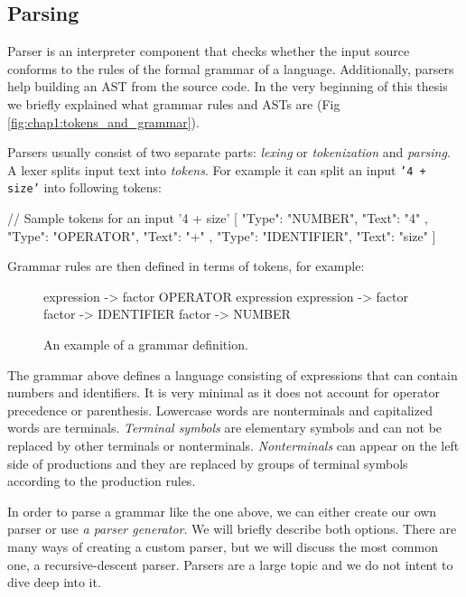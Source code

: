 \subsection{Parsing}
Parser is an interpreter component that checks whether the input source conforms to the rules of the formal grammar of a language. Additionally, parsers help
building an AST from the source code. In the very beginning of this thesis we briefly explained what grammar rules and ASTs are
(Fig \ref{fig:chap1:tokens_and_grammar}).

Parsers usually consist of two separate parts: \emph{lexing} or \emph{tokenization} and \emph{parsing}. A lexer splits input text into \emph{tokens}.
For example it can split an input \texttt{'4 + size'} into following tokens:
\begin{code}
// Sample tokens for an input '4 + size'
[{ "Type": "NUMBER", "Text": "4" },
 { "Type": "OPERATOR", "Text": "+" },
 { "Type": "IDENTIFIER", "Text": "size" }]
\end{code}

Grammar rules are then defined in terms of tokens, for example:
\begin{figure}[!hbt]
    \begin{code}
    expression -> factor OPERATOR expression
    expression -> factor
    factor -> IDENTIFIER
    factor -> NUMBER
    \end{code}
    \caption{An example of a grammar definition.}
    \label{fig:chap4:grammar}
\end{figure}

The grammar above defines a language consisting of expressions that can contain numbers and identifiers. It is very minimal as it does not account
for operator precedence or parenthesis. Lowercase words are nonterminals and capitalized words are terminals. \emph{Terminal symbols} are elementary
symbols and can not be replaced by other terminals or nonterminals. \emph{Nonterminals} can appear on the left side of productions and they are replaced by groups
of terminal symbols according to the production rules.

In order to parse a grammar like the one above, we can either create our own parser or use \emph{a parser generator}. We will briefly describe both options.
There are many ways of creating a custom parser, but we will discuss the most common one, a recursive-descent parser. Parsers are a large topic and
we do not intent to dive deep into it.

